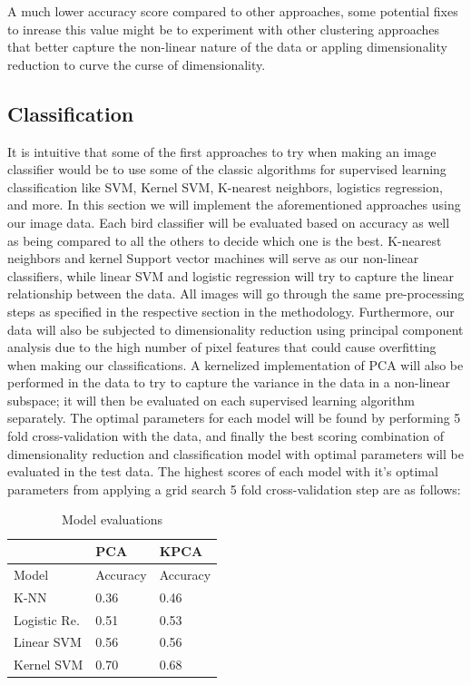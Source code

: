 \documentclass[11pt]{article}
\begin{document}
\begin{singlespace}
A much lower accuracy score compared to other approaches, some potential fixes to inrease this value might be to experiment with other clustering approaches that better capture the non-linear nature of the data or appling dimensionality reduction to curve the curse of dimensionality. \\


\subsection{Classification}
It is intuitive that some of the first approaches to try when making an image classifier would be to use some of the classic algorithms for supervised learning classification like SVM, Kernel SVM, K-nearest neighbors, logistics regression, and more. In this section we will implement the aforementioned approaches using our image data. Each bird classifier will be evaluated based on accuracy as well as being compared to all the others to decide which one is the best. K-nearest neighbors and kernel Support vector machines will serve as our non-linear classifiers, while linear SVM and logistic regression will try to capture the linear relationship between the data. All images will go through the same pre-processing steps as specified in the respective section in the methodology. Furthermore, our data will also be subjected to dimensionality reduction using principal component analysis due to the high number of pixel features that could cause overfitting when making our classifications. A kernelized implementation of PCA will also be performed in the data to try to capture the variance in the data in a non-linear subspace; it will then be evaluated on each supervised learning algorithm separately. The optimal parameters for each model will be found by performing 5 fold cross-validation with the data, and finally the best scoring combination of dimensionality reduction and classification model with optimal parameters will be evaluated in the test data. The highest scores of each model with it's optimal parameters from applying a grid search 5 fold cross-validation step are as follows: 

\begin{table}[h]
    \centering
    \begin{tabular}{ |M{2.5cm}|M{2cm}|M{2cm}|}
	 \hline
	 & PCA & KPCA \\
	 \hline
	 Model & Accuracy&Accuracy\\
	 \hline
	 K-NN & 0.36 &  0.46  \\
	 Logistic Re. & 0.51 & 0.53 \\
	 Linear SVM& 0.56 & 0.56 \\
	 Kernel SVM& 0.70 & 0.68 \\
	 \hline
   \end{tabular} \\
   \caption{Model evaluations}
\end{table}


\end{singlespace}
\end{document}
